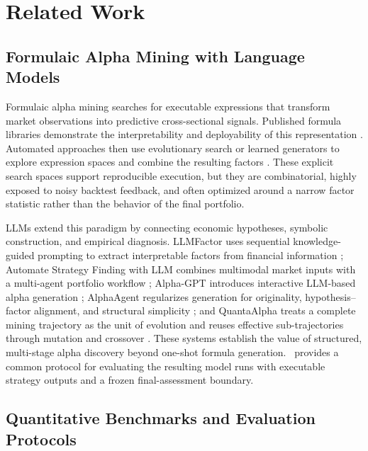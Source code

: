 \section{Related Work}
\label{sec:related}

\subsection{Formulaic Alpha Mining with Language Models}

Formulaic alpha mining searches for executable expressions that transform market observations into predictive cross-sectional signals. Published formula libraries demonstrate the interpretability and deployability of this representation \citep{Kakushadze2016Formulaic}. Automated approaches then use evolutionary search or learned generators to explore expression spaces and combine the resulting factors \citep{Zhang2020AutoAlpha,Shi2024AlphaForge}. These explicit search spaces support reproducible execution, but they are combinatorial, highly exposed to noisy backtest feedback, and often optimized around a narrow factor statistic rather than the behavior of the final portfolio.

LLMs extend this paradigm by connecting economic hypotheses, symbolic construction, and empirical diagnosis. LLMFactor uses sequential knowledge-guided prompting to extract interpretable factors from financial information \citep{Wang2024LLMFactor}; Automate Strategy Finding with LLM combines multimodal market inputs with a multi-agent portfolio workflow \citep{Kou2024AutomateStrategy}; Alpha-GPT introduces interactive LLM-based alpha generation \citep{Wang2023AlphaGPT}; AlphaAgent regularizes generation for originality, hypothesis--factor alignment, and structural simplicity \citep{Tang2025AlphaAgent}; and QuantaAlpha treats a complete mining trajectory as the unit of evolution and reuses effective sub-trajectories through mutation and crossover \citep{Han2026QuantaAlpha}. These systems establish the value of structured, multi-stage alpha discovery beyond one-shot formula generation. \BenchmarkName\ provides a common protocol for evaluating the resulting model runs with executable strategy outputs and a frozen final-assessment boundary.

\subsection{Quantitative Benchmarks and Evaluation Protocols}

